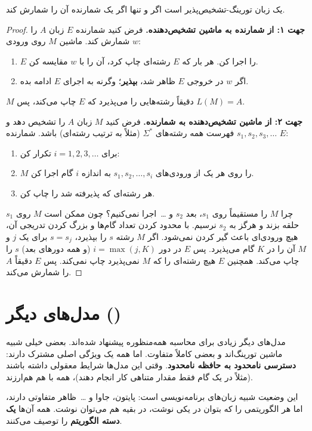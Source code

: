 \begin{theorem}
یک زبان تورینگ-تشخیص‌پذیر است اگر و تنها اگر یک شمارنده آن را شمارش کند.
\end{theorem}
\begin{proof}
\textbf{جهت ۱: از شمارنده به ماشین تشخیص‌دهنده.} فرض کنید شمارنده $E$ زبان $A$ را شمارش کند. ماشین $M$ روی ورودی $w$:
\begin{enumerate}
\item $E$ را اجرا کن. هر بار که $E$ رشته‌ای چاپ کرد، آن را با $w$ مقایسه کن.
\item اگر $w$ در خروجی $E$ ظاهر شد، \textbf{بپذیر}؛ وگرنه به اجرای $E$ ادامه بده.
\end{enumerate}
$M$ دقیقاً رشته‌هایی را می‌پذیرد که $E$ چاپ می‌کند، پس $L(M)=A$.

\textbf{جهت ۲: از ماشین تشخیص‌دهنده به شمارنده.} فرض کنید $M$ زبان $A$ را تشخیص دهد و $s_1,s_2,s_3,\dots$ فهرست همه رشته‌های $\Sigma^*$ (مثلاً به ترتیب رشته‌ای) باشد. شمارنده $E$:
\begin{enumerate}
\item برای $i=1,2,3,\dots$ تکرار کن:
\item \quad $M$ را روی هر یک از ورودی‌های $s_1,s_2,\dots,s_i$ به اندازه $i$ گام اجرا کن.
\item \quad هر رشته‌ای که پذیرفته شد را چاپ کن.
\end{enumerate}
چرا $M$ را مستقیماً روی $s_1$، بعد $s_2$ و \dots\ اجرا نمی‌کنیم؟ چون ممکن است $M$ روی $s_1$ حلقه بزند و هرگز به $s_2$ نرسیم. با محدود کردن تعداد گام‌ها و بزرگ کردن تدریجی آن، هیچ ورودی‌ای باعث گیر کردن نمی‌شود. اگر $M$ رشته $s$ را بپذیرد، $s=s_j$ برای یک $j$ و $M$ آن را در $K$ گام می‌پذیرد. پس $E$ در دور $i=\max(j,K)$ (و همه دورهای بعد) $s$ را چاپ می‌کند. همچنین $E$ هیچ رشته‌ای را که $M$ نمی‌پذیرد چاپ نمی‌کند. پس $E$ دقیقاً $A$ را شمارش می‌کند.
\end{proof}

\section{مدل‌های دیگر ()}

مدل‌های دیگر زیادی برای محاسبه همه‌منظوره پیشنهاد شده‌اند. بعضی خیلی شبیه ماشین تورینگ‌اند و بعضی کاملاً متفاوت. اما همه یک ویژگی اصلی مشترک دارند: \textbf{دسترسی نامحدود به حافظه نامحدود}. وقتی این مدل‌ها شرایط معقولی داشته باشند (مثلاً در یک گام فقط مقدار متناهی کار انجام دهند)، همه با هم هم‌ارزند.

این وضعیت شبیه زبان‌های برنامه‌نویسی است: پایتون، جاوا و \dots\ ظاهر متفاوتی دارند، اما هر الگوریتمی را که بتوان در یکی نوشت، در بقیه هم می‌توان نوشت. همه آن‌ها \textbf{یک دسته الگوریتم} را توصیف می‌کنند.

